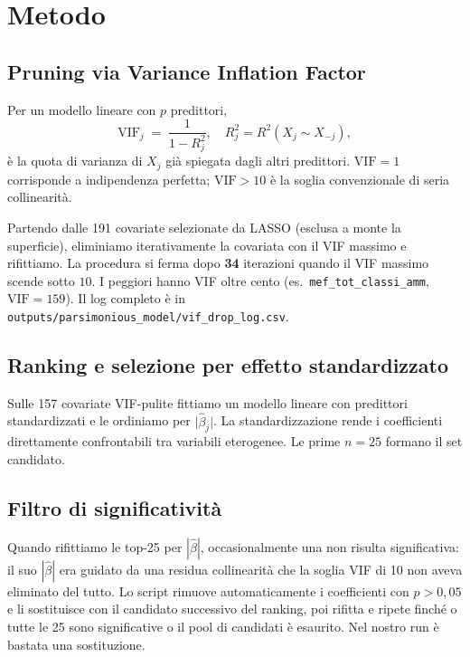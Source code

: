 \documentclass[11pt,a4paper]{article}
\begin{document}
\section{Metodo}

\subsection{Pruning via Variance Inflation Factor}

Per un modello lineare con $p$ predittori,
\begin{equation}
  \mathrm{VIF}_j \;=\; \frac{1}{1 - R^{2}_{j}},
  \quad
  R^{2}_{j} = R^{2}\!\left(X_j \sim X_{-j}\right),
\end{equation}
\`e la quota di varianza di $X_j$ gi\`a spiegata dagli altri
predittori. $\mathrm{VIF}=1$ corrisponde a indipendenza perfetta;
$\mathrm{VIF}>10$ \`e la soglia convenzionale di seria
collinearit\`a.

Partendo dalle 191 covariate selezionate da LASSO (esclusa a monte
la superficie), eliminiamo iterativamente la covariata con il VIF
massimo e rifittiamo. La procedura si ferma dopo \textbf{34}
iterazioni quando il VIF massimo scende sotto $10$. I peggiori
hanno VIF oltre cento (es.\ \texttt{mef\_tot\_classi\_amm},
$\mathrm{VIF}=159$). Il log completo \`e in
\verb|outputs/parsimonious_model/vif_drop_log.csv|.

\subsection{Ranking e selezione per effetto standardizzato}

Sulle 157 covariate VIF-pulite fittiamo un modello lineare con
predittori standardizzati e le ordiniamo per
$\lvert\hat\beta_j\rvert$. La standardizzazione rende i coefficienti
direttamente confrontabili tra variabili eterogenee. Le prime
$n=25$ formano il set candidato.

\subsection{Filtro di significativit\`a}

Quando rifittiamo le top-25 per $|\hat\beta|$, occasionalmente una
non risulta significativa: il suo $|\hat\beta|$ era guidato da una
residua collinearit\`a che la soglia VIF di 10 non aveva eliminato
del tutto. Lo script rimuove automaticamente i coefficienti con
$p > 0{,}05$ e li sostituisce con il candidato successivo del
ranking, poi rifitta e ripete finch\'e o tutte le 25 sono
significative o il pool di candidati \`e esaurito. Nel nostro run
\`e bastata una sostituzione.
\end{document}
